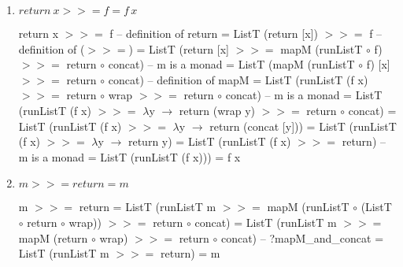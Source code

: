 \documentclass{article}
\newcommand{\hbind}{>\!\!\!>\!\!\!=}
\begin{document}
\begin{enumerate}
\item $return\: x \hbind f = f\, x$
\begin{code}
   return x $\hbind$ f
-- definition of return
= ListT (return [x]) $\hbind$ f
-- definition of ($\hbind$)
= ListT (return [x] $\hbind$ mapM (runListT $\circ$ f) $\hbind$ return $\circ$ concat)
-- m is a monad
= ListT (mapM (runListT $\circ$ f) [x] $\hbind$ return $\circ$ concat)
-- definition of mapM
= ListT (runListT (f x) $\hbind$ return $\circ$ wrap $\hbind$ return $\circ$ concat)
-- m is a monad
= ListT (runListT (f x) $\hbind$ $\lambda$y $\to$ return (wrap y) $\hbind$ return $\circ$ concat)
= ListT (runListT (f x) $\hbind$ $\lambda$y $\to$ return (concat [y]))
= ListT (runListT (f x) $\hbind$ $\lambda$y $\to$ return y)
= ListT (runListT (f x) $\hbind$ return)
-- m is a monad
= ListT (runListT (f x)))
= f x
\end{code}
\item $m \hbind return = m$
\begin{code}
   m $\hbind$ return
= ListT (runListT m $\hbind$ mapM (runListT $\circ$ (ListT $\circ$ return $\circ$ wrap)) $\hbind$ return $\circ$ concat)
= ListT (runListT m $\hbind$ mapM (return $\circ$ wrap) $\hbind$ return $\circ$ concat)
-- ?mapM_and_concat
= ListT (runListT m $\hbind$ return)
= m


\end{code}
\end{enumerate}
\end{document}
